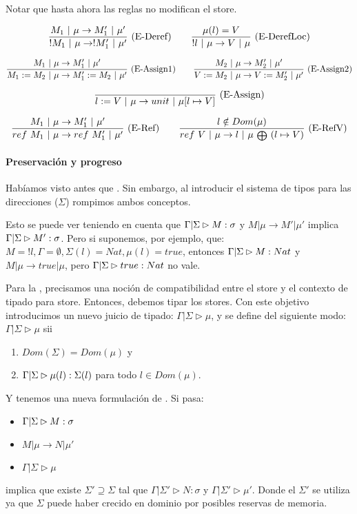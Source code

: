 Notar que hasta ahora las reglas no modifican el store.

\[\frac{M_1 \ |\  \mu \to M_1' \ |\  \mu'}{!M_1 \ |\  \mu \to !M_1' \ |\  \mu'}\ \text{(E-Deref)}\quad\quad \frac{\mu(l) = V}{!l \ |\  \mu \to V \ |\  \mu}\ \text{(E-DerefLoc)}\]

\[\frac{M_1 \ |\  \mu \to M_1' \ |\  \mu'}{M_1 := M_2 \ |\  \mu \to M_1' := M_2 \ |\  \mu'}\ \text{(E-Assign1)}\quad\quad \frac{M_2 \ |\  \mu \to M_2' \ |\  \mu'}{V := M_2 \ |\  \mu \to V := M_2' \ |\  \mu'}\ \text{(E-Assign2)}\]

\[\frac{}{l := V \ |\  \mu \to unit \ |\  \mu[l \mapsto V]}\ \text{(E-Assign)}\]

\[\deriv{M_1 \vert \mu \to M_1' \vert \mu'}{ref\ M_1 \vert \mu \to ref\ M_1' \vert \mu'}{E-Ref}\quad\quad \deriv{l \notin Dom(\mu)}{ref\ V \vert \mu \to l \vert \mu\ {\scriptstyle \medoplus}\ (l \mapsto V)}{E-RefV}\]

\paragraph{Preservación y progreso}

Habíamos visto antes que . Sin embargo, al introducir el sistema de tipos para las direcciones ($\Sigma$) rompimos ambos conceptos.

Esto se puede ver teniendo en cuenta que $\Gamma|\Sigma \rhd M : \sigma$ y $M \vert \mu \to M' \vert \mu'$ implica $\Gamma|\Sigma \rhd M' : \sigma$. Pero si suponemos, por ejemplo, que: $M = !l, \Gamma = \emptyset, \Sigma(l) = Nat, \mu(l) = true$, entonces $\Gamma|\Sigma \rhd M : Nat$ y $M \vert \mu \to true \vert \mu$, pero $\Gamma|\Sigma \rhd true : Nat$ no vale.

Para la , precisamos una noción de compatibilidad entre el store y el contexto de tipado para store. Entonces, debemos tipar los stores. Con este objetivo introducimos un nuevo juicio de tipado: $\Gamma|\Sigma \rhd \mu$, y se define del siguiente modo: $\Gamma|\Sigma \rhd \mu$ sii
\begin{enumerate}
  \item $Dom(\Sigma) = Dom(\mu)$ y
  \item $\Gamma|\Sigma \rhd \mu(l) : \Sigma(l)$ para todo $l \in Dom(\mu)$.
\end{enumerate}

Y tenemos una nueva formulación de . Si pasa:
\begin{itemize}
  \item $\Gamma|\Sigma \rhd M : \sigma$
  \item $M \vert \mu \to N \vert \mu'$
  \item $\Gamma|\Sigma \rhd \mu$
\end{itemize}
implica que existe $\Sigma' \supseteq \Sigma$ tal que $\Gamma|\Sigma' \rhd N : \sigma$ y $\Gamma|\Sigma' \rhd \mu'$. Donde el $\Sigma'$ se utiliza ya que $\Sigma$ puede haber crecido en dominio por posibles reservas de memoria.

